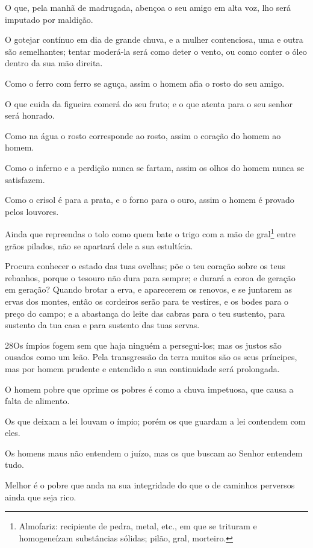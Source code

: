 O que, pela manhã de madrugada, abençoa o seu amigo em alta voz,
lho será imputado por maldição.

O gotejar contínuo em dia de grande chuva, e a mulher
contenciosa, uma e outra são semelhantes; tentar moderá-la
será como deter o vento, ou como conter o óleo dentro da sua mão
direita.

Como o ferro com ferro se aguça, assim o homem afia o rosto do
seu amigo.

O que cuida da figueira comerá do seu fruto; e o que atenta para
o seu senhor será honrado.

Como na água o rosto corresponde ao rosto, assim o coração do
homem ao homem.

Como o inferno e a perdição nunca se fartam, assim os olhos do
homem nunca se satisfazem.

Como o crisol é para a prata, e o forno para o ouro, assim o
homem é provado pelos louvores.

Ainda que repreendas o tolo como quem bate o trigo com a mão de
gral\footnote{Almofariz: recipiente de pedra, metal, etc., em que se
trituram e homogeneízam substâncias sólidas; pilão, gral, morteiro.}
entre grãos pilados, não se apartará dele a sua estultícia.

Procura conhecer o estado das tuas ovelhas; põe o teu coração
sobre os teus rebanhos, porque o tesouro não dura para
sempre; e durará a coroa de geração em geração? Quando brotar
a erva, e aparecerem os renovos, e se juntarem as ervas dos montes,
então os cordeiros serão para te vestires, e os bodes para o
preço do campo; e a abastança do leite das cabras para o teu
sustento, para sustento da tua casa e para sustento das tuas servas.

\medskip

\lettrine{28}{}Os ímpios fogem sem que haja ninguém a
persegui-los; mas os justos são ousados como um leão.  Pela transgressão da terra muitos são os seus príncipes, mas por
homem prudente e entendido a sua continuidade será prolongada.

O homem pobre que oprime os pobres é como a chuva impetuosa, que
causa a falta de alimento.

Os que deixam a lei louvam o ímpio; porém os que guardam a lei
contendem com eles.

Os homens maus não entendem o juízo, mas os que buscam ao Senhor
entendem tudo.

Melhor é o pobre que anda na sua integridade do que o de caminhos
perversos ainda que seja rico.

